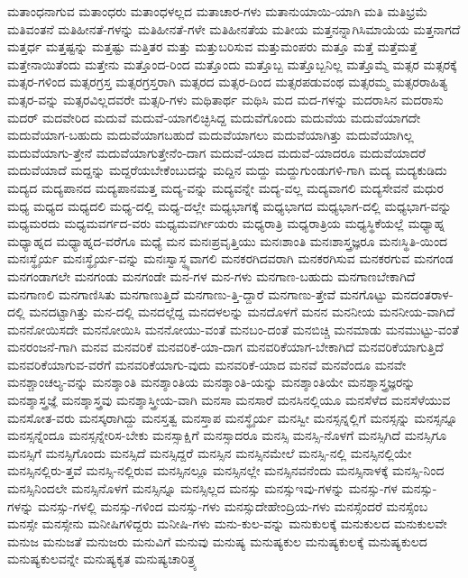 {ಮತಾಂಧನಾಗುವ
ಮತಾಂಧರು
ಮತಾಂಧಳಲ್ಲದ
ಮತಾಚಾರ-ಗಳು
ಮತಾನುಯಾಯಿ-ಯಾಗಿ
ಮತಿ
ಮತಿಭ್ರಮೆ
ಮತಿವಂತನೆ
ಮತಿಹೀನತೆ-ಗಳನ್ನು
ಮತಿಹೀನತೆ-ಗಳೇ
ಮತಿಹೀನತೆಯ
ಮತೀಯ
ಮತ್ತನನ್ನಾಗಿಸಿಮಾಯೆಯ
ಮತ್ತನಾಗದೆ
ಮತ್ತರ್ಧ
ಮತ್ತಷ್ಟನ್ನು
ಮತ್ತಷ್ಟು
ಮತ್ತಿತರ
ಮತ್ತು
ಮತ್ತುಬರಿಸುವ
ಮತ್ತುಮಂಪರು
ಮತ್ತೂ
ಮತ್ತೆ
ಮತ್ತೆಮತ್ತೆ
ಮತ್ತೇನಾಯಿತೆಂದು
ಮತ್ತೇನು
ಮತ್ತೊಂದ-ರಿಂದ
ಮತ್ತೊಂದು
ಮತ್ತೊಬ್ಬ
ಮತ್ತೊಬ್ಬನಿಲ್ಲ
ಮತ್ತೊಮ್ಮೆ
ಮತ್ಸರ
ಮತ್ಸರಕ್ಕೆ
ಮತ್ಸರ-ಗಳಿಂದ
ಮತ್ಸರಗ್ರಸ್ತ
ಮತ್ಸರಗ್ರಸ್ತರಾಗಿ
ಮತ್ಸರದ
ಮತ್ಸರ-ದಿಂದ
ಮತ್ಸರಪಡುವಂಥ
ಮತ್ಸರಮ್ಮ
ಮತ್ಸರರಾಹಿತ್ಯ
ಮತ್ಸರ-ವನ್ನು
ಮತ್ಸರವಿಲ್ಲದವರೇ
ಮತ್ಸರಿ-ಗಳು
ಮಥಿತಾರ್ಥ
ಮಥಿಸಿ
ಮದ
ಮದ-ಗಳನ್ನು
ಮದರಾಸಿನ
ಮದರಾಸು
ಮದರ್
ಮದವೇರಿದ
ಮದುವೆ
ಮದುವೆ-ಯಾಗಲಿಚ್ಛಿಸಿದ್ದ
ಮದುವೆಗೊಂದು
ಮದುವೆಯ
ಮದುವೆಯಾಗದೇ
ಮದುವೆಯಾಗ-ಬಹುದು
ಮದುವೆಯಾಗಬಹುದೆ
ಮದುವೆಯಾಗಲು
ಮದುವೆಯಾಗಿತ್ತು
ಮದುವೆಯಾಗಿಲ್ಲ
ಮದುವೆಯಾಗು-ತ್ತೇನೆ
ಮದುವೆಯಾಗುತ್ತೇನೆಂ-ದಾಗ
ಮದುವೆ-ಯಾದ
ಮದುವೆ-ಯಾದರೂ
ಮದುವೆಯಾದರೆ
ಮದುವೆಯಾದೆ
ಮದ್ದನ್ನು
ಮದ್ದರೆಯಬೇಕೆಂಬುದನ್ನು
ಮದ್ದಿನ
ಮದ್ದು
ಮದ್ದುಗುಂಡುಗಳಿ-ಗಾಗಿ
ಮದ್ಯ
ಮದ್ಯಕುಡಿದು
ಮದ್ಯದ
ಮದ್ಯಪಾನದ
ಮದ್ಯಪಾನಮತ್ತ
ಮದ್ಯ-ವನ್ನು
ಮದ್ಯವನ್ನೇ
ಮದ್ಯ-ವಲ್ಲ
ಮದ್ಯವಾಗಲಿ
ಮದ್ಯಸೇವನೆ
ಮಧುರ
ಮಧ್ಯ
ಮಧ್ಯದ
ಮಧ್ಯದಲಿ
ಮಧ್ಯ-ದಲ್ಲಿ
ಮಧ್ಯ-ದಲ್ಲೇ
ಮಧ್ಯಭಾಗಕ್ಕೆ
ಮಧ್ಯಭಾಗದ
ಮಧ್ಯಭಾಗ-ದಲ್ಲಿ
ಮಧ್ಯಭಾಗ-ವನ್ನು
ಮಧ್ಯಮರದು
ಮಧ್ಯಮವರ್ಗದ-ವರು
ಮಧ್ಯಮವರ್ಗೀಯರು
ಮಧ್ಯರಾತ್ರಿ
ಮಧ್ಯರಾತ್ರಿಯ
ಮಧ್ಯಸ್ಥಿಕೆಯಲ್ಲೆ
ಮಧ್ಯಾಹ್ನ
ಮಧ್ಯಾಹ್ನದ
ಮಧ್ಯಾಹ್ನದ-ವರೆಗೂ
ಮಧ್ಯೆ
ಮನ
ಮನಃಪ್ರವೃತ್ತಿಯು
ಮನಃಶಾಂತಿ
ಮನಃಶಾಸ್ತ್ರಜ್ಞರೂ
ಮನಃಸ್ಥಿತಿ-ಯಿಂದ
ಮನಃಸ್ಥೈರ್ಯ
ಮನಃಸ್ಥೈರ್ಯ-ವನ್ನು
ಮನಃಸ್ವಾಸ್ಥ್ಯವಾಗಲಿ
ಮನಕರಗಿದವರಾಗಿ
ಮನಕರಗಿಸುವ
ಮನಕರಗುವ
ಮನಗಂಡ
ಮನಗಂಡಾಗಲೇ
ಮನಗಂಡು
ಮನಗಂಡೇ
ಮನ-ಗಳ
ಮನ-ಗಳು
ಮನಗಾಣ-ಬಹುದು
ಮನಗಾಣಬೇಕಾಗಿದೆ
ಮನಗಾಣಲಿ
ಮನಗಾಣಿಸಿತು
ಮನಗಾಣುತ್ತಿದೆ
ಮನಗಾಣು-ತ್ತಿ-ದ್ದಾರೆ
ಮನಗಾಣು-ತ್ತೇವೆ
ಮನಗೊಟ್ಟು
ಮನದಂತರಾಳ-ದಲ್ಲಿ
ಮನದಟ್ಟಾಗಿತ್ತು
ಮನ-ದಲ್ಲಿ
ಮನದಲ್ಲೆದ್ದ
ಮನದಳಲನ್ನು
ಮನದೊಳಗೆ
ಮನನ
ಮನನೀಯ
ಮನನೀಯ-ವಾಗಿದೆ
ಮನನೋಯಿಸದೇ
ಮನನೋಯಿಸಿ
ಮನನೋಯು-ವಂತೆ
ಮನಬಂ-ದಂತೆ
ಮನಬಿಚ್ಚಿ
ಮನಮಾಡು
ಮನಮುಟ್ಟು-ವಂತೆ
ಮನರಂಜನೆ-ಗಾಗಿ
ಮನವ
ಮನವರಿಕೆ
ಮನವರಿಕೆ-ಯಾ-ದಾಗ
ಮನವರಿಕೆಯಾಗ-ಬೇಕಾಗಿದೆ
ಮನವರಿಕೆಯಾಗುತ್ತಿದೆ
ಮನವರಿಕೆಯಾಗುವ-ವರೆಗೆ
ಮನವರಿಕೆಯಾಗು-ವುದು
ಮನವರಿಕೆ-ಯಾದ
ಮನವೆ
ಮನವೆಂದೂ
ಮನವೇ
ಮನಶ್ಚಾಂಚಲ್ಯ-ವನ್ನು
ಮನಶ್ಶಾಂತಿ
ಮನಶ್ಶಾಂತಿಯ
ಮನಶ್ಶಾಂತಿ-ಯನ್ನು
ಮನಶ್ಶಾಂತಿಯೇ
ಮನಶ್ಶಾಸ್ತ್ರಜ್ಞರನ್ನು
ಮನಶ್ಶಾಸ್ತ್ರಜ್ಞೆ
ಮನಶ್ಶಾಸ್ತ್ರವು
ಮನಶ್ಶಾಸ್ತ್ರೀಯ-ವಾಗಿ
ಮನಸಾ
ಮನಸಾರೆ
ಮನಸಿನಲ್ಲಿಯೂ
ಮನಸೆಳೆದ
ಮನಸೆಳೆಯುವ
ಮನಸೋತ-ವರು
ಮನಸ್ಕರಾಗಿದ್ದು
ಮನಸ್ತತ್ವ
ಮನಸ್ತಾಪ
ಮನಸ್ಥೈರ್ಯ
ಮನಸ್ವೀ
ಮನಸ್ಸನ್ನಲ್ಲಿಗೆ
ಮನಸ್ಸನ್ನು
ಮನಸ್ಸನ್ನೂ
ಮನಸ್ಸನ್ನೆಂದೂ
ಮನಸ್ಸನ್ನೇರಿಸ-ಬೇಕು
ಮನಸ್ಸಾಕ್ಷಿಗೆ
ಮನಸ್ಸಾದರೂ
ಮನಸ್ಸಿ
ಮನಸ್ಸಿ-ನೊಳಗೆ
ಮನಸ್ಸಿಗಿದೆ
ಮನಸ್ಸಿಗೂ
ಮನಸ್ಸಿಗೆ
ಮನಸ್ಸಿಗೊಂದು
ಮನಸ್ಸಿದೆ
ಮನಸ್ಸಿದ್ದರೆ
ಮನಸ್ಸಿನ
ಮನಸ್ಸಿನಮೇಲೆ
ಮನಸ್ಸಿ-ನಲ್ಲಿ
ಮನಸ್ಸಿನಲ್ಲಿಯೇ
ಮನಸ್ಸಿನಲ್ಲಿರು-ತ್ತವೆ
ಮನಸ್ಸಿ-ನಲ್ಲಿರುವ
ಮನಸ್ಸಿನಲ್ಲೂ
ಮನಸ್ಸಿನಲ್ಲೇ
ಮನಸ್ಸಿನವನೆಂದು
ಮನಸ್ಸಿನಾಳಕ್ಕೆ
ಮನಸ್ಸಿ-ನಿಂದ
ಮನಸ್ಸಿನಿಂದಲೇ
ಮನಸ್ಸಿನೊಳಗೆ
ಮನಸ್ಸಿನ್ನೂ
ಮನಸ್ಸಿಲ್ಲದ
ಮನಸ್ಸು
ಮನಸ್ಸುಇವು-ಗಳನ್ನು
ಮನಸ್ಸು-ಗಳ
ಮನಸ್ಸು-ಗಳನ್ನು
ಮನಸ್ಸು-ಗಳಲ್ಲಿ
ಮನಸ್ಸು-ಗಳಿಂದ
ಮನಸ್ಸು-ಗಳು
ಮನಸ್ಸುದೇಹೇಂದ್ರಿಯ-ಗಳು
ಮನಸ್ಸೆಂದರೆ
ಮನಸ್ಸೆಂಬ
ಮನಸ್ಸೇ
ಮನಸ್ಸೇನು
ಮನೀಷಿಗಳಿದ್ದರು
ಮನೀಷಿ-ಗಳು
ಮನು-ಕುಲ-ವನ್ನು
ಮನುಕುಲಕ್ಕೆ
ಮನುಕುಲದ
ಮನುಕುಲವೇ
ಮನುಜ
ಮನುಜತೆ
ಮನುಜರು
ಮನುವಿಗೆ
ಮನುವು
ಮನುಷ್ಯ
ಮನುಷ್ಯಕುಲ
ಮನುಷ್ಯಕುಲಕ್ಕೆ
ಮನುಷ್ಯಕುಲದ
ಮನುಷ್ಯಕುಲವನ್ನೇ
ಮನುಷ್ಯಕೃತ
ಮನುಷ್ಯಚಾರಿತ್ರ್ಯ
}
